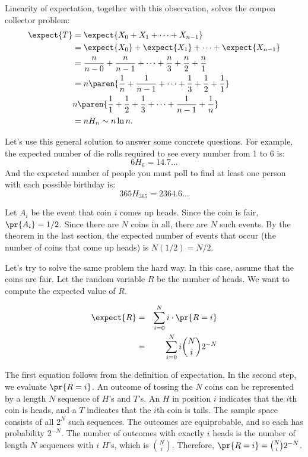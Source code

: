 Linearity of expectation, together with this observation, solves the
coupon collector problem:
%
\begin{align*}
\expect{T} & = \expect{X_0 + X_1 + \cdots + X_{n-1}} \\ & = \expect{X_0} +
  \expect{X_1} + \cdots + \expect{X_{n-1}} \\ & = \frac{n}{n - 0} +
  \frac{n}{n - 1} + \cdots + \frac{n}{3} + \frac{n}{2} + \frac{n}{1} \\ &
  = n \paren{\frac{1}{n} + \frac{1}{n-1} + \cdots + \frac{1}{3} +
  \frac{1}{2} + \frac{1}{1}} \\ & n \paren{\frac{1}{1} + \frac{1}{2} +
  \frac{1}{3} + \cdots + \frac{1}{n-1} + \frac{1}{n}}\\
  & = n H_n \sim n \ln n.
\end{align*}

Let's use this general solution to answer some concrete questions.
For example, the expected number of die rolls required to see every
number from 1 to 6 is:
%
\[
6 H_6 = 14.7 \dots
\]
%
And the expected number of people you must poll to find at least one
person with each possible birthday is:
%
\[
365 H_{365} = 2364.6\dots
\]

\iffalse

Let $A_i$ be the event that coin $i$ comes up heads.
Since the coin is fair, $\pr{A_i} = 1/2$.  Since
there are $N$ coins in all, there are $N$ such events.  By the theorem
in the last section, the expected number of events that occur (the
number of coins that come up heads) is $N(1/2) =
N/2$.

Let's try to solve the same problem the hard way.  In this case,
assume that the coins are fair.  Let the random variable $R$ be the
number of heads.  We want to compute the expected value of $R$.

\begin{eqnarray*}
\expect{R}  & = & \sum_{i=0}^N i \cdot \pr{R = i} \\
        & = & \sum_{i=0}^N i \binom{N}{i} 2^{-N}
\end{eqnarray*}

The first equation follows from the definition of expectation.  In the
second step, we evaluate $\pr{R = i}$.  An outcome of tossing the $N$
coins can be represented by a length $N$ sequence of $H$'s and $T$'s.
An $H$ in position $i$ indicates that the $i$th coin is heads, and a
$T$ indicates that the $i$th coin is tails.  The sample space
consists of all $2^N$ such sequences.  The outcomes are equiprobable,
and so each has probability $2^{-N}$.  The number of outcomes with
exactly $i$ heads is the number of length $N$ sequences with $i$
$H$'s, which is $\binom{N}{i}$.  Therefore, $\pr{R = i} = \binom{N}{i}
2^{-N}$.

